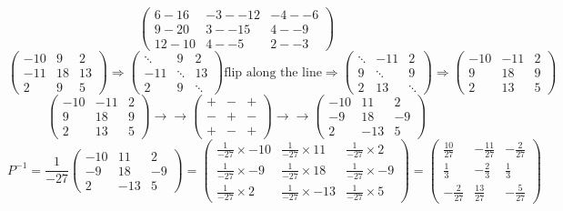 \documentclass{article}
\begin{document}
\[
	\begin{pmatrix}
		6-16 & -3--12 & -4--6\\
		9-20 & 3--15 & 4--9\\
		12-10 & 4--5 & 2--3
	\end{pmatrix}
\]
\[
	\begin{pmatrix}
		-10 & 9 & 2\\
		-11 & 18 & 13\\
		2 & 9 & 5
	\end{pmatrix}
	\Rightarrow
	\begin{pmatrix}
		\ddots & 9 & 2\\
		-11 & \ddots & 13\\
		2 & 9 & \ddots
	\end{pmatrix}
	\mbox{flip along the line}
	\Rightarrow
	\begin{pmatrix}
		\ddots & -11 & 2\\
		9 & \ddots & 9\\
		2 & 13 & \ddots
	\end{pmatrix}
	\Rightarrow
	\begin{pmatrix}
		-10 & -11 & 2\\
		9 & 18 & 9\\
		2 & 13 & 5
	\end{pmatrix}

\]
\[
	\begin{pmatrix}
		-10 & -11 & 2\\
		9 & 18 & 9\\
		2 & 13 & 5
	\end{pmatrix}
	\rightarrow
	\rightarrow
	\begin{pmatrix}
		+ & - & +\\
		- & + & -\\
		+ & - & +
	\end{pmatrix}
	\rightarrow
	\rightarrow
	\begin{pmatrix}
		-10 & 11 & 2\\
		-9 & 18 & -9\\
		2 & -13 & 5
	\end{pmatrix}
\]
\[
	P^{-1} = 
	\frac{1}{-27}
	\begin{pmatrix}
		-10 & 11 & 2\\
		-9 & 18 & -9\\
		2 & -13 & 5
	\end{pmatrix}
	=
	\begin{pmatrix}
		\frac{1}{-27}\times-10 & \frac{1}{-27}\times11 & \frac{1}{-27}\times2\\
		\frac{1}{-27}\times-9 & \frac{1}{-27}\times18 & \frac{1}{-27}\times-9\\
		\frac{1}{-27}\times2 & \frac{1}{-27}\times-13 & \frac{1}{-27}\times5
	\end{pmatrix}
	=
	\begin{pmatrix}
		\frac{10}{27} & -\frac{11}{27} & -\frac{2}{27}\\
		\frac{1}{3} & -\frac{2}{3} & \frac{1}{3}\\
		-\frac{2}{27} & \frac{13}{27} & -\frac{5}{27}
	\end{pmatrix}
\]
\end{document}
